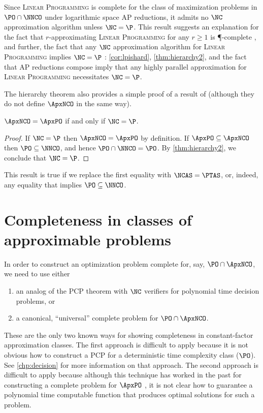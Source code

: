Since \textsc{Linear Programming} is complete for the class of maximization problems in $\PO \cap \NNCO$ under logarithmic space AP reductions, it admits no $\NC$ approximation algorithm unless $\NC = \P$.
This result suggests an explanation for the fact that $r$-approximating \textsc{Linear Programming} for any $r \geq 1$ is \P-complete \cite[Theorem~8.2.7]{dsst97}, and further, the fact that any $\NC$ approximation algorithm for \textsc{Linear Programming} implies $\NC = \P$ \cite[Theorem~8.2.8]{dsst97}: \autoref{cor:lpishard}, \autoref{thm:hierarchy2}, and the fact that AP reductions compose imply that any highly parallel approximation for \textsc{Linear Programming} necessitates $\NC = \P$.

The hierarchy theorem also provides a simple proof of a result of \cite{dsst97} (although they do not define $\ApxNCO$ in the same way).

\begin{corollary}
  $\ApxNCO = \ApxPO$ if and only if $\NC = \P$.
\end{corollary}
\begin{proof}
  If $\NC = \P$ then $\ApxNCO = \ApxPO$ by definition.
  If $\ApxPO \subseteq \ApxNCO$ then $\PO \subseteq \NNCO$, and hence $\PO \cap \NNCO = \PO$.
  By \autoref{thm:hierarchy2}, we conclude that $\NC = \P$.
\end{proof}

This result is true if we replace the first equality with $\NCAS = \PTAS$, or, indeed, any equality that implies $\PO \subseteq \NNCO$.

\section{Completeness in classes of approximable problems}

In order to construct an optimization problem complete for, say, $\PO \cap \ApxNCO$, we need to use either
\begin{enumerate}
\item an analog of the PCP theorem with $\NC$ verifiers for polynomial time decision problems, or
\item a canonical, ``universal'' complete problem for $\PO \cap \ApxNCO$.
\end{enumerate}
These are the only two known ways for showing completeness in constant-factor approximation classes.
The first approach is difficult to apply because it is not obvious how to construct a PCP for a deterministic time complexity class ($\PO$).
See \autoref{chp:decision} for more information on that approach.
The second approach is difficult to apply because although this technique has worked in the past for constructing a complete problem for $\ApxPO$ \cite[Lemma~2]{cp91}, it is not clear how to guarantee a polynomial time computable function that produces optimal solutions for such a problem.

